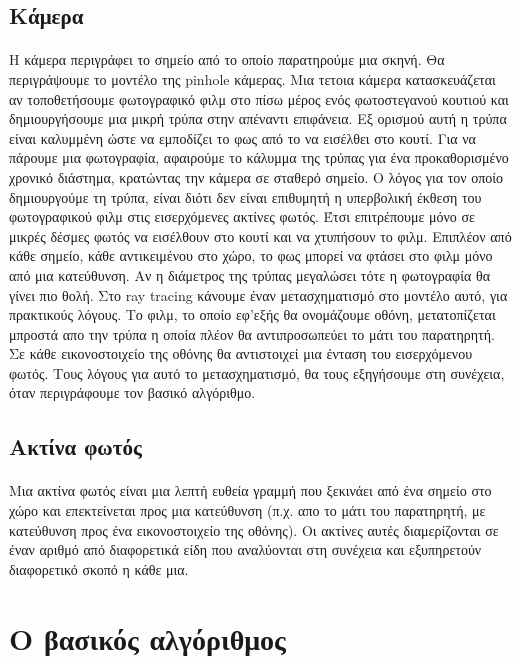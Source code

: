 \begin{sloppypar}
\subsection{Κάμερα}
\paragraph{}
	H κάμερα περιγράφει το σημείο από το οποίο παρατηρούμε μια σκηνή. Θα περιγράψουμε το μοντέλο της pinhole
κάμερας. Μια τετοια κάμερα κατασκευάζεται αν τοποθετήσουμε φωτογραφικό φιλμ στο πίσω μέρος ενός φωτοστεγανού κουτιού 
και δημιουργήσουμε μια μικρή τρύπα στην απέναντι επιφάνεια. Εξ ορισμού αυτή η τρύπα είναι καλυμμένη ώστε να 
εμποδίζει το φως από το να εισέλθει στο κουτί. Για να πάρουμε μια φωτογραφία, αφαιρούμε το κάλυμμα της τρύπας 
για ένα προκαθορισμένο χρονικό διάστημα, κρατώντας την κάμερα σε σταθερό σημείο. Ο λόγος για τον οποίο δημιουργούμε 
τη τρύπα, είναι διότι δεν είναι επιθυμητή η υπερβολική έκθεση του φωτογραφικού φιλμ στις εισερχόμενες ακτίνες φωτός. 
Έτσι επιτρέπουμε μόνο σε μικρές δέσμες φωτός να εισέλθουν στο κουτί και να χτυπήσουν το φιλμ. Επιπλέον από κάθε 
σημείο, κάθε αντικειμένου στο χώρο, το φως μπορεί να φτάσει στο φιλμ μόνο από μια κατεύθυνση. Αν η διάμετρος 
της τρύπας μεγαλώσει τότε η φωτογραφία θα γίνει πιο θολή. Στο ray tracing κάνουμε έναν μετασχηματισμό στο μοντέλο
αυτό, για πρακτικούς λόγους. Το φιλμ, το οποίο εφ'εξής θα ονομάζουμε οθόνη, μετατοπίζεται μπροστά απο την τρύπα η 
οποία πλέον θα αντιπροσωπεύει το μάτι του παρατηρητή. Σε κάθε εικονοστοιχείο της οθόνης θα αντιστοιχεί μια ένταση
του εισερχόμενου φωτός. Τους λόγους για αυτό το μετασχηματισμό, θα τους εξηγήσουμε στη συνέχεια, όταν περιγράφουμε
τον βασικό αλγόριθμο.

\subsection{Ακτίνα φωτός}
\paragraph{}
	Μια ακτίνα φωτός είναι μια λεπτή ευθεία γραμμή που ξεκινάει από ένα σημείο στο χώρο και επεκτείνεται προς 
μια κατεύθυνση (π.χ. απο το μάτι του παρατηρητή, με κατεύθυνση προς ένα εικονοστοιχείο της οθόνης). Οι ακτίνες αυτές 
διαμερίζονται σε έναν αριθμό από διαφορετικά είδη που αναλύονται στη συνέχεια και εξυπηρετούν διαφορετικό σκοπό η κάθε μια.

\section{Ο βασικός αλγόριθμος}

\end{sloppypar}
